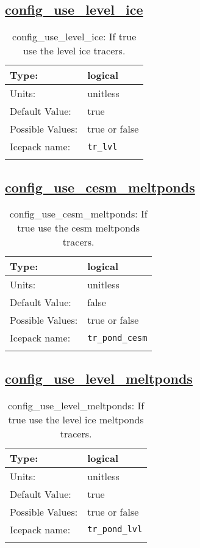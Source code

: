 \subsection[config\_use\_level\_ice]{\hyperref[sec:nm_tab_column_tracers]{config\_use\_level\_ice}}
\label{subsec:nm_sec_config_use_level_ice}
\begin{center}
\begin{longtable}{| p{2.0in} || p{4.0in} |}
    \hline
    Type: & logical \\
    \hline
    Units: & \si{unitless} \\
    \hline
    Default Value: & true \\
    \hline
    Possible Values: & true or false \\
    \hline
    \hline
    Icepack name: & \verb+tr_lvl+ \\
    \caption{config\_use\_level\_ice: If true use the level ice tracers.}
\end{longtable}
\end{center}
\subsection[config\_use\_cesm\_meltponds]{\hyperref[sec:nm_tab_column_tracers]{config\_use\_cesm\_meltponds}}
\label{subsec:nm_sec_config_use_cesm_meltponds}
\begin{center}
\begin{longtable}{| p{2.0in} || p{4.0in} |}
    \hline
    Type: & logical \\
    \hline
    Units: & \si{unitless} \\
    \hline
    Default Value: & false \\
    \hline
    Possible Values: & true or false \\
    \hline
    \hline
    Icepack name: & \verb+tr_pond_cesm+ \\
    \caption{config\_use\_cesm\_meltponds: If true use the cesm meltponds tracers.}
\end{longtable}
\end{center}
\subsection[config\_use\_level\_meltponds]{\hyperref[sec:nm_tab_column_tracers]{config\_use\_level\_meltponds}}
\label{subsec:nm_sec_config_use_level_meltponds}
\begin{center}
\begin{longtable}{| p{2.0in} || p{4.0in} |}
    \hline
    Type: & logical \\
    \hline
    Units: & \si{unitless} \\
    \hline
    Default Value: & true \\
    \hline
    Possible Values: & true or false \\
    \hline
    \hline
    Icepack name: & \verb+tr_pond_lvl+ \\
    \caption{config\_use\_level\_meltponds: If true use the level ice meltponds tracers.}
\end{longtable}
\end{center}
